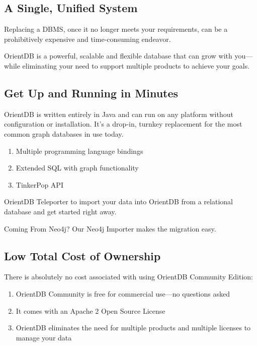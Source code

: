 \documentclass[
	final,
	a4paper,
	oneside,
	parskip=half,
	headings=standardclasses,
	headings=big,
	pointednumbers,
    fleqn
]{scrartcl}
\begin{document}
\begin{multicols*}{2}
        \subsection{A Single, Unified System}

            Replacing a DBMS, once it no longer meets your requirements, can be a prohibitively expensive and time-consuming endeavor.

            OrientDB is a powerful, scalable and flexible database that can grow with you—while eliminating your need to support multiple products to achieve your goals.

        \subsection{Get Up and Running in Minutes}

            OrientDB is written entirely in Java and can run on any platform without configuration or installation. It's a drop-in, turnkey replacement for the most common graph databases in use today.

            \begin{enumerate}
                \item Multiple programming language bindings
                \item Extended SQL with graph functionality
                \item TinkerPop API
            \end{enumerate}

            OrientDB Teleporter to import your data into OrientDB from a relational database and get started right away.

            Coming From Neo4j? Our Neo4j Importer makes the migration easy.

        \subsection{Low Total Cost of Ownership}

            There is absolutely no cost associated with using OrientDB Community Edition:

            \begin{enumerate}
                \item OrientDB Community is free for commercial use—no questions asked
                \item It comes with an Apache 2 Open Source License
                \item OrientDB eliminates the need for multiple products and multiple licenses to manage your data
            \end{enumerate}


\end{multicols*}
\end{document}
